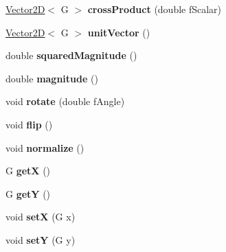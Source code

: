 \begin{DoxyCompactItemize}
\item 
\hypertarget{class_vector2_d_a5d05faaee31dd6f71dfdc4a57502e4f8}{}\hyperlink{class_vector2_d}{Vector2\+D}$<$ G $>$ {\bfseries cross\+Product} (double f\+Scalar)\label{class_vector2_d_a5d05faaee31dd6f71dfdc4a57502e4f8}

\item 
\hypertarget{class_vector2_d_a1a734dd9f1ca01a88bac3f6bf2be97d0}{}\hyperlink{class_vector2_d}{Vector2\+D}$<$ G $>$ {\bfseries unit\+Vector} ()\label{class_vector2_d_a1a734dd9f1ca01a88bac3f6bf2be97d0}

\item 
\hypertarget{class_vector2_d_af4162d18ba5939bd0175ae01ad6f0221}{}double {\bfseries squared\+Magnitude} ()\label{class_vector2_d_af4162d18ba5939bd0175ae01ad6f0221}

\item 
\hypertarget{class_vector2_d_aab76e76bb642784480bdd231b90b1273}{}double {\bfseries magnitude} ()\label{class_vector2_d_aab76e76bb642784480bdd231b90b1273}

\item 
\hypertarget{class_vector2_d_a85f594928169b9c4bb74cc26ab43d111}{}void {\bfseries rotate} (double f\+Angle)\label{class_vector2_d_a85f594928169b9c4bb74cc26ab43d111}

\item 
\hypertarget{class_vector2_d_a6191843e792557d9532da82b79b026aa}{}void {\bfseries flip} ()\label{class_vector2_d_a6191843e792557d9532da82b79b026aa}

\item 
\hypertarget{class_vector2_d_a0de406dcf396cb5b629bf196c1101621}{}void {\bfseries normalize} ()\label{class_vector2_d_a0de406dcf396cb5b629bf196c1101621}

\item 
\hypertarget{class_vector2_d_a46521876fbb0b52881eba97a074ba59c}{}G {\bfseries get\+X} ()\label{class_vector2_d_a46521876fbb0b52881eba97a074ba59c}

\item 
\hypertarget{class_vector2_d_ac0ecf6cdb4b8106b8c1c2a08efc728df}{}G {\bfseries get\+Y} ()\label{class_vector2_d_ac0ecf6cdb4b8106b8c1c2a08efc728df}

\item 
\hypertarget{class_vector2_d_a6c5526343de1af297d3cc4baca03a9b1}{}void {\bfseries set\+X} (G x)\label{class_vector2_d_a6c5526343de1af297d3cc4baca03a9b1}

\item 
\hypertarget{class_vector2_d_ac7ba076a26efb04c2e590a0cdd3fd20e}{}void {\bfseries set\+Y} (G y)\label{class_vector2_d_ac7ba076a26efb04c2e590a0cdd3fd20e}


\end{DoxyCompactItemize}
